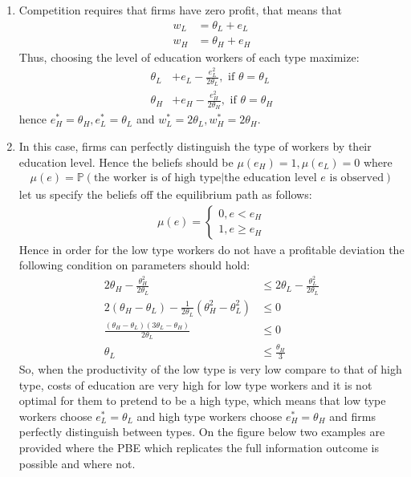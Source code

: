 \documentclass[a4paper]{article}
\newcommand{\prob}{\mathbb{P}}
\begin{document}
\begin{enumerate}
	\item Competition requires that firms have zero profit, that means that
	\begin{align*}
	w_L &= \theta_L + e_L\\
	w_H &= \theta_H + e_H
	\end{align*}
	Thus, choosing the level of education workers of each type maximize:
	\begin{align*}
	\theta_L &+ e_L - \frac{e^2_L}{2\theta_L}, \text{ if } \theta = \theta_L\\
	\theta_H &+ e_H - \frac{e^2_H}{2\theta_H}, \text{ if } \theta = \theta_H
	\end{align*}
	hence $e^*_H = \theta_H, e^*_L = \theta_L$ and $w^*_L = 2\theta_L, w^*_H = 2\theta_H$.
	\item In this case, firms can perfectly distinguish the type of workers by their education level. Hence the beliefs should be $\mu(e_H) = 1, \mu(e_L) = 0$ where
	\begin{align*}
	\mu(e) = \prob(\text{the worker is of high type}|\text{the education level } e \text{ is observed})
	\end{align*}
	let us specify the beliefs off the equilibrium path as follows:
	\begin{align*}
	\mu(e) = \begin{cases}
	0, e < e_H\\
	1, e \ge e_H
	\end{cases}
	\end{align*}
	Hence in order for the low type workers do not have a profitable deviation the following condition on parameters should hold:
	\begin{align*}
	2\theta_H - \frac{\theta_H^2}{2\theta_L} &\le 2\theta_L - \frac{\theta_L^2}{2\theta_L}\\
	2(\theta_H - \theta_L) - \frac{1}{2\theta_L}(\theta_H^2 - \theta^2_L) &\le 0\\
	\frac{(\theta_H - \theta_L)(3\theta_L - \theta_H)}{2\theta_L} &\le 0\\
	\theta_L &\le \frac{\theta_H}{3}
	\end{align*}
	So, when the productivity of the low type is very low compare to that of high type, costs of education are very high for low type workers and it is not optimal for them to pretend to be a high type, which means that low type workers choose $e^*_L = \theta_L$ and high type workers choose $e^*_H = \theta_H$ and firms perfectly distinguish between types. On the figure below two examples are provided where the PBE which replicates the full information outcome is possible and where not.

\end{enumerate}
\end{document}
